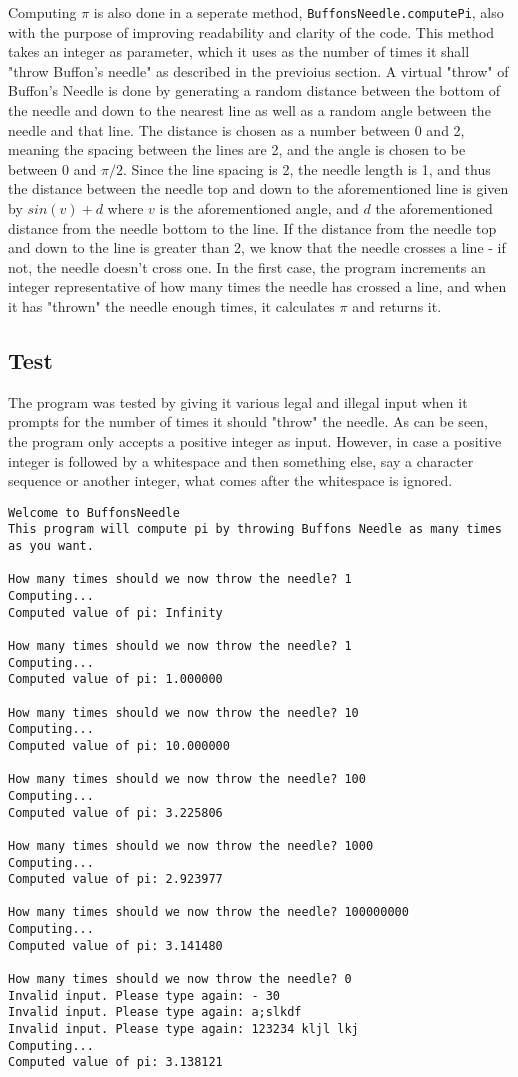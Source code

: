 \documentclass{scrartcl}
\newcommand\code[1]{\texttt{#1}}
\begin{document}
Computing $\pi$  is also done in a seperate method, \code{BuffonsNeedle.computePi},
also with the purpose of improving readability and clarity of the code.
This method takes an integer as parameter, which it uses as the number of times it shall
"throw Buffon's needle" as described in the previoius section. A virtual
"throw" of Buffon's Needle is done by generating a random distance between the bottom
of the needle and down to the nearest line as well as a random angle between the
needle and that line. The distance is chosen as a number between 0 and 2, meaning the
spacing between the lines are 2, and the angle is chosen to be between 0 and $\pi/2$.
Since the line spacing is 2, the needle length is 1, and thus the distance between
the needle top and down to the aforementioned line is given by $sin(v)+d$ where $v$ is the
aforementioned angle, and $d$ the aforementioned distance from the needle bottom to the line.
If the distance from the needle top and down to the line is greater than 2,
we know that the needle crosses a line - if not, the needle doesn't cross one.
In the first case, the program increments an integer representative of how many
times the needle has crossed a line, and when it has "thrown" the needle
enough times, it calculates $\pi$  and returns it.

\subsection*{Test}
The program was tested by giving it various legal and illegal input when 
it prompts for the number of times it should "throw" the needle. As can
be seen, the program only accepts a positive integer as input. However,
in case a positive integer is followed by a whitespace and then something
else, say a character sequence or another integer, what comes after the
whitespace is ignored.
\begin{Verbatim}
Welcome to BuffonsNeedle
This program will compute pi by throwing Buffons Needle as many times as you want.

How many times should we now throw the needle? 1
Computing...
Computed value of pi: Infinity

How many times should we now throw the needle? 1
Computing...
Computed value of pi: 1.000000

How many times should we now throw the needle? 10
Computing...
Computed value of pi: 10.000000

How many times should we now throw the needle? 100
Computing...
Computed value of pi: 3.225806

How many times should we now throw the needle? 1000
Computing...
Computed value of pi: 2.923977

How many times should we now throw the needle? 100000000
Computing...
Computed value of pi: 3.141480

How many times should we now throw the needle? 0
Invalid input. Please type again: - 30
Invalid input. Please type again: a;slkdf
Invalid input. Please type again: 123234 kljl lkj
Computing...
Computed value of pi: 3.138121
\end{Verbatim}
\end{document}
